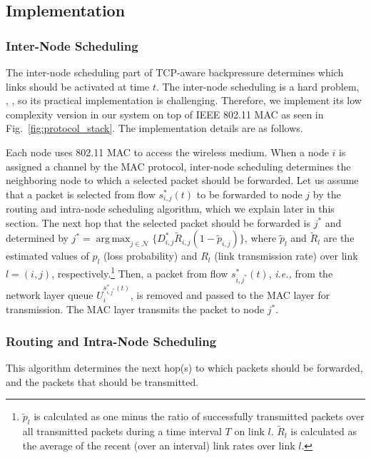 \documentclass[conference]{IEEEtran}
\newcommand{\ie}{{\em i.e., }}
\newcommand{\Nset}{\mathcal{N}}
\DeclareMathOperator*{\argmax}{arg\,max}
\begin{document}
\subsection{Implementation}
\subsubsection{Inter-Node Scheduling}
The inter-node scheduling part of TCP-aware backpressure determines which links should be activated at time $t$.  The inter-node scheduling is a hard problem, \cite{tutorial_doyle}, \cite{lin_schroff_tutorial}, so its practical implementation is challenging. Therefore, we implement its low complexity version in our system on top of IEEE 802.11 MAC as seen in Fig.~\ref{fig:protocol_stack}. The implementation details are as follows.








Each node uses 802.11 MAC to access the wireless medium. When a node $i$ is assigned a channel by the MAC protocol, inter-node scheduling determines the neighboring node to which a selected packet should be forwarded. Let us assume that a packet is selected from flow $s_{i,j}^{*}(t)$ to be forwarded to node $j$ by the routing and intra-node scheduling algorithm, which we explain later in this section. The next hop that the selected packet should be forwarded is $j^{*}$ and determined by $j^{*} = \argmax_{j \in \Nset} \{D_{i,j}^{*} \tilde{R}_{i,j} (1 - \tilde{p}_{i,j})\}$, where $\tilde{p}_l$ and $\tilde{R}_l$ are the estimated values of $p_l$ (loss probability) and $R_l$ (link transmission rate) over link $l=(i,j)$, respectively.\footnote{\scriptsize $\tilde{p}_l$ is calculated as one minus the ratio of successfully transmitted packets over all transmitted packets during a time interval $T$ on link $l$. $\tilde{R}_l$ is calculated as the average of the recent (over an interval) link rates over link $l$.}
Then, a packet from flow $s_{i,j^{*}}^{*}(t)$, \ie from the network layer queue $U_{i}^{s_{i,j^{*}}^{*}(t)}$, is removed and passed to the MAC layer for transmission. The MAC layer transmits the packet to node $j^{*}$.





\subsubsection{Routing and Intra-Node Scheduling}
This algorithm determines the next hop(s) to which packets should be forwarded, and the packets that should be transmitted.
\end{document}
